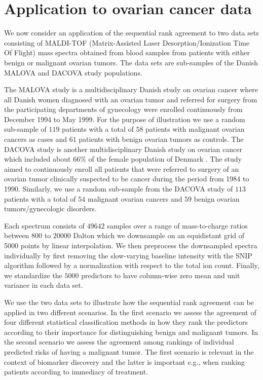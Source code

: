 \documentclass[12pt,a4paper]{article}
\theoremstyle{plain}
\begin{document}
\section{Application to ovarian cancer data}
We now consider an application of the sequential rank agreement to two
data sets consisting of MALDI-TOF (Matrix-Assisted Laser
Desorption/Ionization Time Of Flight) mass spectra obtained from blood
samples from patients with either benign or malignant ovarian
tumors. The data sets are sub-samples of the Danish MALOVA and DACOVA
study populations.

The MALOVA study is a multidisciplinary Danish study on ovarian cancer
\citep{Hogdall:2004:Cancer:15160342} where all Danish women diagnosed
with an ovarian tumor and referred for surgery from the participating
departments of gynecology were enrolled continuously from December
1994 to May 1999. For the purpose of illustration we use a random
sub-sample of $119$ patients with a total of $58$ patients with
malignant ovarian cancers as cases and $61$ patients with benign
ovarian tumors as controls. The DACOVA study is another
multidisciplinary Danish study on ovarian cancer which included about
$66\%$ of the female population of Denmark
\citep{bertelsen1991protocol}. The study aimed to continuously enroll
all patients that were referred to surgery of an ovarian tumor
clinically suspected to be cancer during the period from 1984 to
1990. Similarly, we use a random sub-sample from the DACOVA study of
$113$ patients with a total of $54$ malignant ovarian cancers and $59$
benign ovarian tumors/gynecologic disorders.

Each spectrum consists of $49642$ samples over a range of mass-to-charge ratios
between $800$ to $20000$ Dalton which we downsample on an equidistant grid of
5000 points by linear interpolation. We then preprocess the downsampled
spectra individually by first removing the slow-varying baseline intensity
with the SNIP algorithm \citep{ryan1988snip} followed by a
normalization with respect to the total ion count. Finally, we standardize
the $5000$ predictors to have column-wise zero mean and unit variance in
each data set.

We use the two data sets to illustrate how the sequential rank
agreement can be applied in two different scenarios. In the first
scenario we assess the agreement of four different statistical
classification methods in how they rank the predictors according to
their importance for distinguishing benign and malignant tumors. In
the second scenario we assess the agreement among rankings of
individual predicted risks of having a malignant tumor. The first
scenario is relevant in the context of biomarker discovery and the
latter is important e.g., when ranking patients according to immediacy of
treatment.
\end{document}

